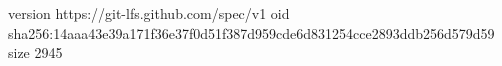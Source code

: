 version https://git-lfs.github.com/spec/v1
oid sha256:14aaa43e39a171f36e37f0d51f387d959cde6d831254cce2893ddb256d579d59
size 2945
